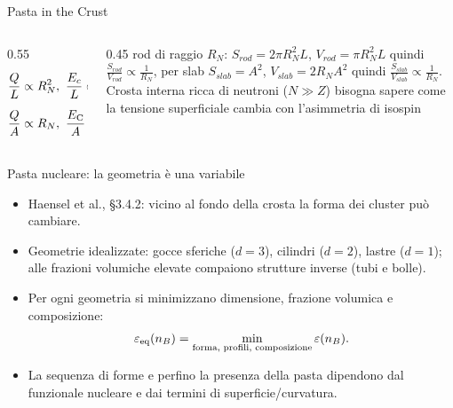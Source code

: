 \begin{frame}{Pasta in the Crust}
\begin{itemize}
\begin{columns}[T]
\begin{column}{0.55\textwidth}
\begin{align*}
& \frac{Q}{L} \propto R_N^2,\ \frac{E_c}{L}\propto\left(\frac{Q}{L}\right)^2\propto R_N^4:\ \epsilon_c\propto R_N^2\tag{rod}\\
& \frac{Q}{A} \propto R_N,\ \frac{E_{\rm C}}{A}\propto\left(\frac{Q}{A}\right)^2 R_N\propto R_N^3:\ \epsilon_c\propto R_N^2\tag{slab}
\end{align*}
                \end{column}
                \begin{column}{0.45\textwidth}
                    rod di raggio $R_N$: $S_{rod}=2\pi R_N^2L$, $V_{rod}=\pi R_N^2L$ quindi $\frac{S_{rod}}{V_{rod}}\propto \frac{1}{R_N}$, per slab $S_{slab}=A^2$, $V_{slab}=2R_NA^2$ quindi $\frac{S_{slab}}{V_{slab}}\propto \frac{1}{R_N}$.
                    Crosta interna ricca di neutroni ($N\gg Z$) bisogna sapere come la tensione superficiale cambia con l'asimmetria di isospin
                    
                \end{column}
            \end{columns}
    \end{itemize}
\end{frame}

\begin{frame}[t]{Pasta nucleare: la geometria è una variabile}
\small
\begin{itemize}
\item Haensel et al., \S3.4.2: vicino al fondo della crosta la forma dei cluster può cambiare.
\item Geometrie idealizzate: gocce sferiche (\(d=3\)), cilindri (\(d=2\)), lastre (\(d=1\)); alle frazioni volumiche elevate compaiono strutture inverse (tubi e bolle).
\item Per ogni geometria si minimizzano dimensione, frazione volumica e composizione:
\[
\varepsilon_{\rm eq}(n_B)=\min_{\text{forma, profili, composizione}}
\varepsilon(n_B).
\]
\item La sequenza di forme e perfino la presenza della pasta dipendono dal funzionale nucleare e dai termini di superficie/curvatura.
\end{itemize}
\end{frame}

